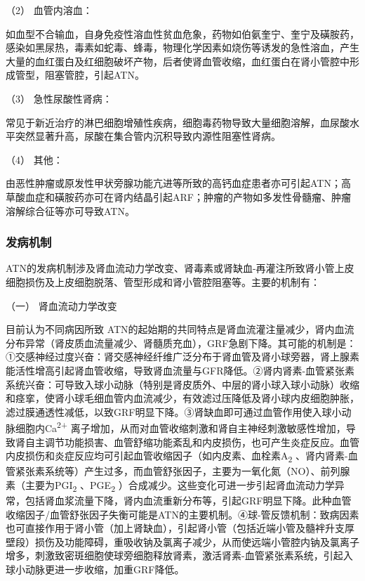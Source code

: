 \hypertarget{text00083.htmlux5cux23CHP3-7-4-1-2-2-2}{}
（2） 血管内溶血：

如血型不合输血，自身免疫性溶血性贫血危象，药物如伯氨奎宁、奎宁及磺胺药，感染如黑尿热，毒素如蛇毒、蜂毒，物理化学因素如烧伤等诱发的急性溶血，产生大量的血红蛋白及红细胞破坏产物，后者使肾血管收缩，血红蛋白在肾小管腔中形成管型，阻塞管腔，引起ATN。

\hypertarget{text00083.htmlux5cux23CHP3-7-4-1-2-2-3}{}
（3） 急性尿酸性肾病：

常见于新近治疗的淋巴细胞增殖性疾病，细胞毒药物导致大量细胞溶解，血尿酸水平突然显著升高，尿酸在集合管内沉积导致内源性阻塞性肾病。

\hypertarget{text00083.htmlux5cux23CHP3-7-4-1-2-2-4}{}
（4） 其他：

由恶性肿瘤或原发性甲状旁腺功能亢进等所致的高钙血症患者亦可引起ATN；高草酸血症和磺胺药亦可在肾内结晶引起ARF；肿瘤的产物如多发性骨髓瘤、肿瘤溶解综合征等亦可导致ATN。

\subsubsection{发病机制}

ATN的发病机制涉及肾血流动力学改变、肾毒素或肾缺血-再灌注所致肾小管上皮细胞损伤及上皮细胞脱落、管型形成和肾小管腔阻塞等。主要的机制有：

\hypertarget{text00083.htmlux5cux23CHP3-7-4-2-1}{}
（一） 肾血流动力学改变

目前认为不同病因所致
ATN的起始期的共同特点是肾血流灌注量减少，肾内血流分布异常（肾皮质血流量减少、肾髓质充血），GRF急剧下降。其可能的机制是：①交感神经过度兴奋：肾交感神经纤维广泛分布于肾血管及肾小球旁器，肾上腺素能活性增高引起肾血管收缩，导致肾血流量与GFR降低。②肾内肾素-血管紧张素系统兴奋：可导致入球小动脉（特别是肾皮质外、中层的肾小球入球小动脉）收缩和痉挛，使肾小球毛细血管内血流减少，有效滤过压降低及肾小球内皮细胞肿胀，滤过膜通透性减低，以致GRF明显下降。③肾缺血即可通过血管作用使入球小动脉细胞内Ca\textsuperscript{2+}
离子增加，从而对血管收缩刺激和肾自主神经刺激敏感性增加，导致肾自主调节功能损害、血管舒缩功能紊乱和内皮损伤，也可产生炎症反应。血管内皮损伤和炎症反应均可引起血管收缩因子（如内皮素、血栓素A\textsubscript{2}
、肾内肾素-血管紧张素系统等）产生过多，而血管舒张因子，主要为一氧化氮（NO）、前列腺素（主要为PGI\textsubscript{2}
、PGE\textsubscript{2}
）合成减少。这些变化可进一步引起肾血流动力学异常，包括肾血浆流量下降，肾内血流重新分布等，引起GRF明显下降。此种血管收缩因子/血管舒张因子失衡可能是ATN的主要机制。④球-管反馈机制：致病因素也可直接作用于肾小管（加上肾缺血），引起肾小管（包括近端小管及髓袢升支厚壁段）损伤及功能障碍，重吸收钠及氯离子减少，从而使远端小管腔内钠及氯离子增多，刺激致密斑细胞使球旁细胞释放肾素，激活肾素-血管紧张素系统，引起入球小动脉更进一步收缩，加重GRF降低。

